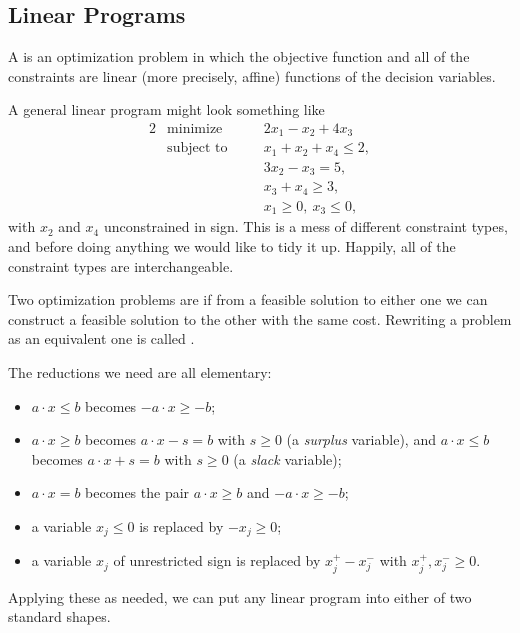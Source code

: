 \subsection{Linear Programs}

\begin{definition}
    A  is an optimization problem in which the objective function and all of the constraints are linear (more precisely, affine) functions of the decision variables.
\end{definition}

A general linear program might look something like
\begin{alignat*}{2}
    & \text{minimize} \quad && 2x_1 - x_2 + 4x_3 \\
    & \text{subject to} \quad && x_1 + x_2 + x_4 \leq 2, \\
    & && 3x_2 - x_3 = 5,\\
    & && x_3 + x_4 \geq 3,\\
    & && x_1 \geq 0,\ x_3 \leq 0,
\end{alignat*}
with $x_2$ and $x_4$ unconstrained in sign. This is a mess of different constraint types, and before doing anything we would like to tidy it up. Happily, all of the constraint types are interchangeable.

\begin{definition}
    Two optimization problems are  if from a feasible solution to either one we can construct a feasible solution to the other with the same cost. Rewriting a problem as an equivalent one is called .
\end{definition}

The reductions we need are all elementary:
\begin{itemize}
    \item $a\cdot x \leq b$ becomes $-a\cdot x \geq -b$;
    \item $a \cdot x \geq b$ becomes $a\cdot x - s = b$ with $s \geq 0$ (a \emph{surplus} variable), and $a\cdot x \leq b$ becomes $a\cdot x + s = b$ with $s \geq 0$ (a \emph{slack} variable);
    \item $a\cdot x = b$ becomes the pair $a\cdot x \geq b$ and $-a\cdot x \geq -b$;
    \item a variable $x_j \leq 0$ is replaced by $-x_j \geq 0$;
    \item a variable $x_j$ of unrestricted sign is replaced by $x_j^+ - x_j^-$ with $x_j^+, x_j^- \geq 0$.
\end{itemize}
Applying these as needed, we can put any linear program into either of two standard shapes.

